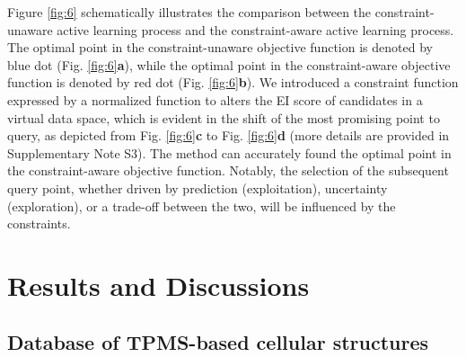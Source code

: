 \documentclass[preprint,review,12pt,authoryear]{elsarticle}
\begin{document}
Figure \ref{fig:6} schematically illustrates the comparison between the constraint-unaware active learning process and the constraint-aware active learning process. The optimal point in the constraint-unaware objective function is denoted by blue dot (Fig. \ref{fig:6}\textbf{a}), while the optimal point in the constraint-aware objective function is denoted by red dot (Fig. \ref{fig:6}\textbf{b}). We introduced a constraint function expressed by a normalized function to alters the EI score of candidates in a virtual data space, which is evident in the shift of the most promising point to query, as depicted from Fig. \ref{fig:6}\textbf{c} to Fig. \ref{fig:6}\textbf{d} (more details are provided in Supplementary Note S3). The method can accurately found the optimal point in the constraint-aware objective function. Notably, the selection of the subsequent query point, whether driven by prediction (exploitation), uncertainty (exploration), or a trade-off between the two, will be influenced by the constraints. 

\section{Results and Discussions}

\subsection{Database of TPMS-based cellular structures }
\end{document}

